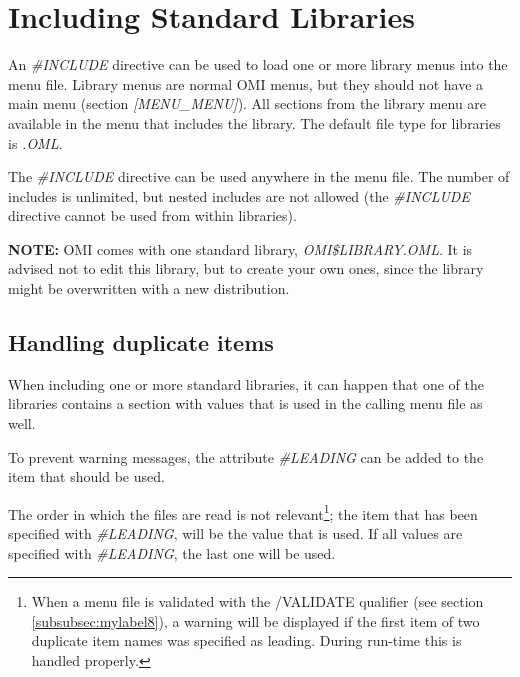 \documentclass[a4paper]{book}
\newcommand{\vs}{\vspace{3mm}}
\begin{document}
\section{Including Standard Libraries}
\label{subsec:including}

An \textsl{{\#}INCLUDE} directive can be used to load one or more 
library menus into the menu file. Library menus are normal OMI menus, but 
they should not have a main menu (section \textsl{[MENU{\_}MENU]}). All sections from 
the library menu are available in the menu that includes the library. The 
default file type for libraries is \textsl{.OML}.

\vs

The \textsl{{\#}INCLUDE} directive can be used anywhere in the menu file. The number 
of includes is unlimited, but nested includes are not allowed (the 
\textsl{{\#}INCLUDE} directive cannot be used from within libraries).

\vs

\hspace{-8mm}\textbf{NOTE:} OMI comes with one standard library, 
\textsl{OMI{\$}LIBRARY.OML}. It is advised not to edit this library, but to 
create your own ones, since the library might be overwritten with a new 
distribution.

\subsection{Handling duplicate items}
\label{subsubsec:handling}

When including one or more standard libraries, it can happen that one of the 
libraries contains a section with values that is used in the calling menu 
file as well.

To prevent warning messages, the attribute \textsl{{\#}LEADING} can be added 
to the item that should be used.

\vs

The order in which the files are read is not relevant\footnote{ When a menu 
file is validated with the \textsf{/VALIDATE} qualifier (see section 
\ref{subsubsec:mylabel8}), a warning will be displayed if the first 
item of two duplicate item names was specified as leading. During run-time 
this is handled properly.}; the item that has been specified with 
\textsl{{\#}LEADING}, will be the value that is used. If all values are specified 
with \textsl{{\#}LEADING}, the last one will be used.
\end{document}

